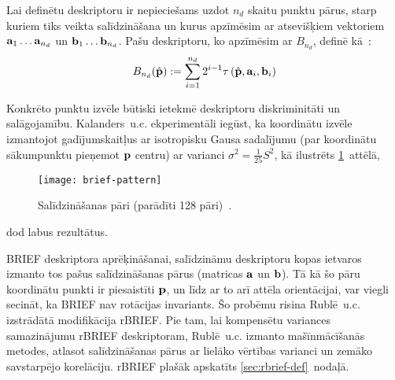 Lai definētu deskriptoru ir nepieciešams uzdot $n_d$ skaitu punktu pārus,
starp kuriem tiks veikta salīdzināšana un
kurus apzīmēsim ar atsevišķiem vektoriem
$\mathbf{a}_1 \dots \mathbf{a}_{n_d}$ un $\mathbf{b}_1 \dots \mathbf{b}_{n_d}$.
Pašu deskriptoru, ko apzīmēsim ar $B_{n_d}$, definē kā~\cite{BRIEF}:
\begin{equation}
	B_{n_d}(\hat{\mathbf{p}}) := 
		\sum_{i=1}^{n_d} 2^{i-1} \tau\left(\hat{\mathbf{p}}, \mathbf{a}_i, \mathbf{b}_i\right)
\end{equation}

Konkrēto punktu izvēle būtiski ietekmē
deskriptoru diskriminitāti un salāgojamību. Kalanders~u.c.\cite{BRIEF}
ekperimentāli iegūst, ka koordinātu izvēle izmantojot gadījumskaitļus ar
isotropisku Gausa sadalījumu (par koordinātu sākumpunktu pieņemot
$\mathbf{p}$ centru) ar varianci $\sigma^2 = \frac{1}{25} S^2$, kā ilustrēts
\ref{fig:pattern1}~attēlā,
\begin{figure}[tbh]
	\centering
	\texttt{[image: brief-pattern]}
	\caption{Salīdzināšanas pāri (parādīti 128 pāri)~\cite{BRIEF}.}
	\label{fig:pattern1}
\end{figure}
dod labus rezultātus.

BRIEF deskriptora aprēķināšanai, salīdzināmu deskriptoru kopas ietvaros
izmanto tos pašus salīdzināšanas pārus (matricas $\mathbf{a}$ un $\mathbf{b}$).
Tā kā šo pāru koordinātu punkti ir piesaistīti $\mathbf{p}$, un līdz ar to arī
attēla orientācijai, var viegli secināt, ka BRIEF nav rotācijas invariants.
Šo probēmu risina Rublē~u.c.\cite{ORB} izstrādātā modifikācija rBRIEF.
Pie tam, lai kompensētu variances samazinājumu rBRIEF
deskriptoram, Rublē~u.c.\cite{ORB} izmanto mašīnmācīšanās metodes, atlasot
salīdzināšanas pārus ar lielāko vērtības varianci un zemāko savstarpējo
korelāciju. rBRIEF plašāk apskatīts \ref{sec:rbrief-def}~nodaļā.



